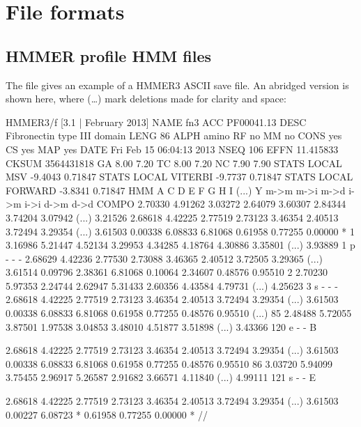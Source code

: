 \section{File formats}
\label{section:formats}
\setcounter{footnote}{0}

\subsection{HMMER profile HMM files}
\label{section:savefiles}

The file  gives an example of a HMMER3 ASCII
save file. An abridged version is shown here, where (\ldots) mark
deletions made for clarity and space:

\begin{tinysreoutput}
HMMER3/f [3.1 | February 2013]
NAME  fn3
ACC   PF00041.13
DESC  Fibronectin type III domain
LENG  86
ALPH  amino
RF    no
MM    no
CONS  yes
CS    yes
MAP   yes
DATE  Fri Feb 15 06:04:13 2013
NSEQ  106
EFFN  11.415833
CKSUM 3564431818
GA    8.00 7.20
TC    8.00 7.20
NC    7.90 7.90
STATS LOCAL MSV       -9.4043  0.71847
STATS LOCAL VITERBI   -9.7737  0.71847
STATS LOCAL FORWARD   -3.8341  0.71847
HMM          A        C        D        E        F        G        H        I    (...)    Y   
            m->m     m->i     m->d     i->m     i->i     d->m     d->d
  COMPO   2.70330  4.91262  3.03272  2.64079  3.60307  2.84344  3.74204  3.07942 (...) 3.21526
          2.68618  4.42225  2.77519  2.73123  3.46354  2.40513  3.72494  3.29354 (...) 3.61503
          0.00338  6.08833  6.81068  0.61958  0.77255  0.00000        *
      1   3.16986  5.21447  4.52134  3.29953  4.34285  4.18764  4.30886  3.35801 (...) 3.93889      1 p - - -
          2.68629  4.42236  2.77530  2.73088  3.46365  2.40512  3.72505  3.29365 (...) 3.61514
          0.09796  2.38361  6.81068  0.10064  2.34607  0.48576  0.95510
      2   2.70230  5.97353  2.24744  2.62947  5.31433  2.60356  4.43584  4.79731 (...) 4.25623      3 s - - -
          2.68618  4.42225  2.77519  2.73123  3.46354  2.40513  3.72494  3.29354 (...) 3.61503
          0.00338  6.08833  6.81068  0.61958  0.77255  0.48576  0.95510
(...)
     85   2.48488  5.72055  3.87501  1.97538  3.04853  3.48010  4.51877  3.51898 (...) 3.43366    120 e - - B
     
          2.68618  4.42225  2.77519  2.73123  3.46354  2.40513  3.72494  3.29354 (...) 3.61503
          0.00338  6.08833  6.81068  0.61958  0.77255  0.48576  0.95510
     86   3.03720  5.94099  3.75455  2.96917  5.26587  2.91682  3.66571  4.11840 (...) 4.99111    121 s - - E
     
          2.68618  4.42225  2.77519  2.73123  3.46354  2.40513  3.72494  3.29354 (...) 3.61503
          0.00227  6.08723        *  0.61958  0.77255  0.00000        *
//
\end{tinysreoutput}

